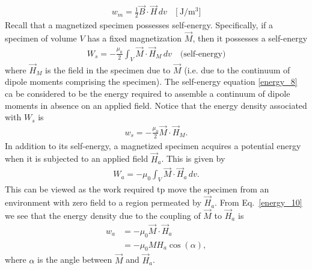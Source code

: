 \documentclass[11pt,a4paper,oneside]{book}
\numberwithin{equation}{section}
\theoremstyle{it}
\theoremstyle{definition}
\begin{document}
\begin{equation}\label{energy_7}
	\boxed{	\begin{aligned}
			w_m = \frac{1}{2}\vec{B}\cdot \vec{H}\,dv \quad\Big[\SI{}{\joule\per\cubic\meter}\Big]
	\end{aligned}}
\end{equation}   
Recall that a magnetized specimen possesses self-energy. Specifically, if a specimen of volume $V$ has a fixed magnetization $\vec{M}$, then it possesses a self-energy 
\begin{equation}\label{energy_8}
	\boxed{	\begin{aligned}
			W_s = -\frac{\mu_0}{2}\int_{V}\vec{M}\cdot \vec{H}_M\,dv \quad\Big(\text{self-energy}\Big)
	\end{aligned}}
\end{equation} 
where $\vec{H}_M$ is the field in the specimen due to $\vec{M}$ (i.e. due to the continuum of dipole moments comprising the specimen). The self-energy equation \ref{energy_8} ca be considered to be the energy required to assemble a continuum of dipole moments in absence on an applied field. Notice that the energy density associated with $W_s$ is
\begin{equation}\label{energy_9}
	\begin{aligned}
			w_s = -\frac{\mu_0}{2}\vec{M}\cdot \vec{H}_M.
	\end{aligned}
\end{equation}
In addition to its self-energy, a magnetized specimen acquires a potential energy when it is subjected to an applied field $\vec{H}_a$. This is given by
\begin{equation}\label{energy_10}
\boxed{	\begin{aligned}
		W_a = -\mu_0\int_{V}\vec{M}\cdot \vec{H}_a\,dv.
	\end{aligned}}
\end{equation}
This can be viewed as the work required tp move the specimen from an environment with zero field to a region permeated by $\vec{H}_a$. From Eq.~\eqref{energy_10} we see that the energy density due to the coupling of $\vec{M}$ to $\vec{H}_a$ is
\begin{equation}\label{energy_11}
\begin{aligned}
	w_a &= -\mu_0 \vec{M}\cdot \vec{H}_a \\[6pt]
	&= -\mu_0 M H_a \cos(\alpha),
\end{aligned}
\end{equation}
where $\alpha$ is the angle between $\vec{M}$ and $\vec{H}_a$.
\end{document}
